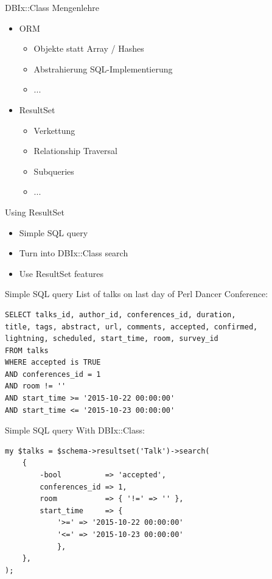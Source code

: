\begin{frame}{DBIx::Class Mengenlehre}
\begin{itemize}
\item ORM
\begin{itemize}
\item Objekte statt Array / Hashes
\item Abstrahierung SQL-Implementierung
\item ...
\end{itemize}

\item ResultSet
\begin{itemize}
\item Verkettung
\item Relationship Traversal
\item Subqueries
\item ...
\end{itemize}
\end{itemize}
\end{frame}

\begin{frame}{Using ResultSet}
\begin{itemize}
\item Simple SQL query
\item Turn into DBIx::Class search
\item Use ResultSet features
\end{itemize}
\end{frame}

\begin{frame}[fragile]{Simple SQL query}
List of talks on last day of Perl Dancer Conference:
\begin{lstlisting}
SELECT talks_id, author_id, conferences_id, duration,
title, tags, abstract, url, comments, accepted, confirmed, 
lightning, scheduled, start_time, room, survey_id 
FROM talks 
WHERE accepted is TRUE 
AND conferences_id = 1 
AND room != '' 
AND start_time >= '2015-10-22 00:00:00'
AND start_time <= '2015-10-23 00:00:00'
\end{lstlisting}
\end{frame}

\begin{frame}[fragile]{Simple SQL query}
With DBIx::Class:
\begin{lstlisting}
my $talks = $schema->resultset('Talk')->search(
    {
        -bool          => 'accepted',
        conferences_id => 1,
        room           => { '!=' => '' },
        start_time     => {
            '>=' => '2015-10-22 00:00:00'
            '<=' => '2015-10-23 00:00:00'
            },
    },
);
\end{lstlisting}
\end{frame}

